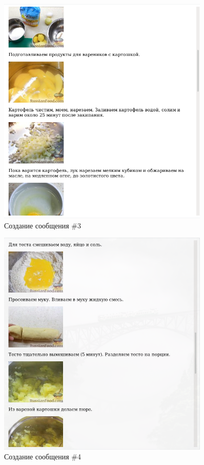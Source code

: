 \documentclass[14pt]{extarticle}
\begin{document}
\begin{figure}[h]
    \centering
	\includegraphics[width=0.9\textwidth, angle=0]{2021-12-12_22-02}
    \caption{Создание сообщения \#3}
    \label{fig:html7}
\end{figure}

\begin{figure}[h]
    \centering
	\includegraphics[width=0.9\textwidth, angle=0]{2021-12-12_22-02_1}
    \caption{Создание сообщения \#4}
    \label{fig:html8}
\end{figure}
\end{document}
